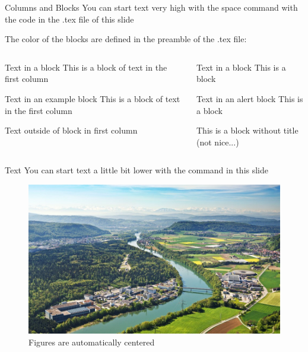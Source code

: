 \documentclass[aspectratio=43]{beamer}
\begin{document}
\begin{frame}{Columns and Blocks}
  You can start text very high with the space command with the code in the  .tex file of this slide

  The color of the blocks are defined in the preamble of the .tex file:
  \begin{columns}
    \begin{column}[T]{4cm}
      \centering
      \begin{block}{Text in a block}
        This is a block of text in the first column
      \end{block}
      \begin{exampleblock}{Text in an example block}
        This is a block of text in the first column
      \end{exampleblock}
      Text outside of block in first column
    \end{column}
    \begin{column}[T]{4cm}
      \begin{block}{Text in a block}
        This is a block 
      \end{block}
      \begin{alertblock}{Text in an alert block}
        This is a block
      \end{alertblock}
      \begin{block}{}
        This is a block without title (not nice...)
      \end{block}
    \end{column}
  \end{columns}
    
    \PSIfill
 \end{frame}


 \begin{frame}{Text}
   \PSIvspace
  You can start text a little bit lower with the command in this slide
  \begin{figure}
    \includegraphics[width=0.3\pagewidth]{PSIlandscape}
    \caption{Figures are automatically centered}
    \label{fig:PSI}
    \end{figure}

     \PSIfill
\end{frame}

  
\end{document}
